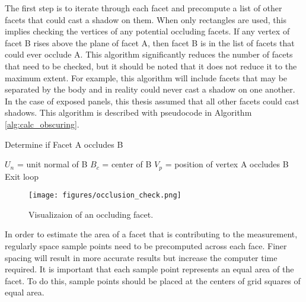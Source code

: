 The first step is to iterate through each facet and precompute a list of other facets that could cast a shadow on them. When only rectangles are used, this implies checking the vertices of any potential occluding facets. If any vertex of facet B rises above the plane of facet A, then facet B is in the list of facets that could ever occlude A. This algorithm significantly reduces the number of facets that need to be checked, but it should be noted that it does not reduce it to the maximum extent. For example, this algorithm will include facets that may be separated by the body and in reality could never cast a shadow on one another. In the case of exposed panels, this thesis assumed that all other facets could cast shadows. This algorithm is described with pseudocode in Algorithm \ref{alg:calc_obscuring}.
\begin{algorithm}
	\caption{Determine if Facet A occludes B}
	\label{alg:calc_obscuring}
	\begin{algorithmic}
		\STATE $U_n$ = unit normal of B
		\STATE $B_c$ = center of B
		\STATE $V_p$ = position of vertex
			\STATE A occludes B
			\STATE Exit loop
		\ENDIF
		\ENDFOR
	\end{algorithmic}
\end{algorithm}
\begin{figure}[h!]
	\centering
	\texttt{[image: figures/occlusion\_check.png]}
	\caption{Visualizaion of an occluding facet.}
	\label{occluding_facet}
\end{figure}

In order to estimate the area of a facet that is contributing to the measurement, regularly space sample points need to be precomputed across each face. Finer spacing will result in more accurate results but increase the computer time required. It is important that each sample point represents an equal area of the facet. To do this, sample points should be placed at the centers of grid squares of equal area.

